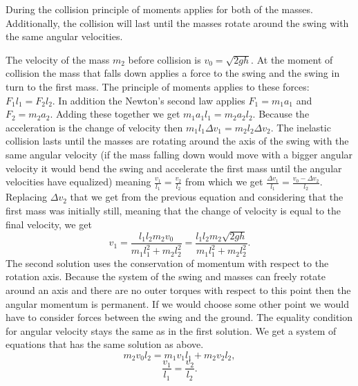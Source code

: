 {\ifEngHint
During the collision principle of moments applies for both of the masses. Additionally, the collision will last until the masses rotate around the swing with the same angular velocities.
\fi


\ifEngSolution
The velocity of the mass $m_2$ before collision is $v_0=\sqrt{2gh}$. At the moment of collision the mass that falls down applies a force to the swing and the swing in turn to the first mass. The principle of moments applies to these forces:  $F_1l_1=F_2l_2$. In addition the Newton’s second law applies $F_1=m_1a_1$ and $F_2=m_2a_2$. Adding these together we get $m_1a_1l_1=m_2a_2l_2$. Because the acceleration is the change of velocity then $m_1l_1\Delta v_1=m_2l_2\Delta v_2$. The inelastic collision lasts until the masses are rotating around the axis of the swing with the same angular velocity (if the mass falling down would move with a bigger angular velocity it would bend the swing and accelerate the first mass until the angular velocities have equalized) meaning $\frac{v_1}{l_1}=\frac{v_2}{l_2}$ from which we get $\frac{\Delta v_1}{l_1}=\frac{v_0-\Delta v_2}{l_2}$. Replacing $\Delta v_2$ that we get from the previous equation and considering that the first mass was initially still, meaning that the change of velocity is equal to the final velocity, we get
\[
v_1=\frac{l_1l_2m_2v_0}{m_1l_1^2+m_2l_2^2}=\frac{l_1l_2m_2\sqrt{2gh}}{m_1l_1^2+m_2l_2^2}.
\] 
The second solution uses the conservation of momentum with respect to the rotation axis. Because the system of the swing and masses can freely rotate around an axis and there are no outer torques with respect to this point then the angular momentum is permanent. If we would choose some other point we would have to consider forces between the swing and the ground. The equality condition for angular velocity stays the same as in the first solution. We get a system of equations that has the same solution as above.
\[
 m_2v_0l_2=m_1v_1l_1+m_2v_2l_2,
\] 
\[
\frac{v_1}{l_1}=\frac{v_2}{l_2}.
\]
\fi
}